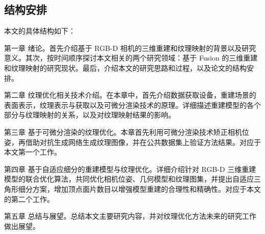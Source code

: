\subsection{结构安排}


本文的具体结构如下： \par
第一章 绪论。首先介绍基于 RGB-D 相机的三维重建和纹理映射的背景以及研究意义。其次，按时间顺序探讨本文相关的两个研究领域：基于 Fusion 的三维重建和纹理映射的研究现状。最后，介绍本文的研究思路和过程，以及论文的结构安排。\par
第二章 纹理优化相关技术介绍。在本章中，首先介绍数据获取设备，重建场景的表面表示，纹理表示与获取以及可微分渲染技术的原理。详细描述重建模型的各个部分与纹理映射的关系，以及对纹理映射结果的影响。\par
第三章 基于可微分渲染的纹理优化。本章首先利用可微分渲染技术矫正相机位姿，再借助对抗生成网络生成纹理图像，并在公共数据集上验证方法结果。对应于本文第一个工作。\par
第四章 基于自适应细分的重建模型与纹理优化。详细介绍针对 RGB-D 三维重建模型的联合优化算法，共同优化相机位姿、几何模型和纹理图集，并提出自适应三角形细分方案，增加顶点面片数目以增强模型重建的合理性和精确性。对应于本文的第二个工作。\par
第五章 总结与展望。总结本文主要研究内容，并对纹理优化方法未来的研究工作做出展望。

